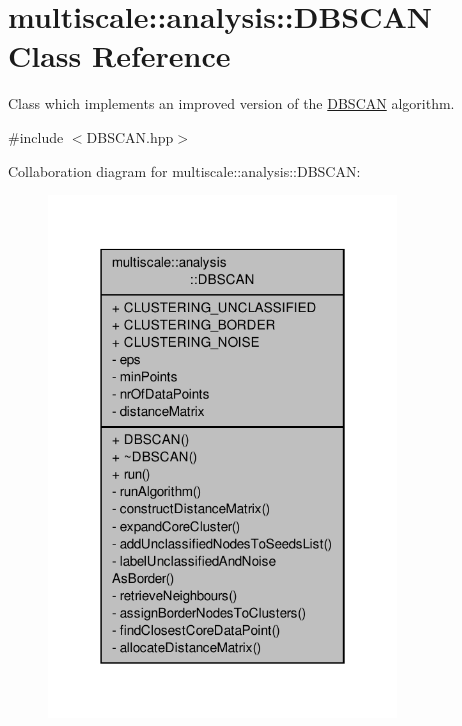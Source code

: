 \hypertarget{classmultiscale_1_1analysis_1_1DBSCAN}{\section{multiscale\-:\-:analysis\-:\-:D\-B\-S\-C\-A\-N Class Reference}
\label{classmultiscale_1_1analysis_1_1DBSCAN}
}


Class which implements an improved version of the \hyperlink{classmultiscale_1_1analysis_1_1DBSCAN}{D\-B\-S\-C\-A\-N} algorithm.  




{\ttfamily \#include $<$D\-B\-S\-C\-A\-N.\-hpp$>$}



Collaboration diagram for multiscale\-:\-:analysis\-:\-:D\-B\-S\-C\-A\-N\-:
\nopagebreak
\begin{figure}[H]
\begin{center}
\leavevmode
\includegraphics[width=262pt]{classmultiscale_1_1analysis_1_1DBSCAN__coll__graph}
\end{center}
\end{figure}
